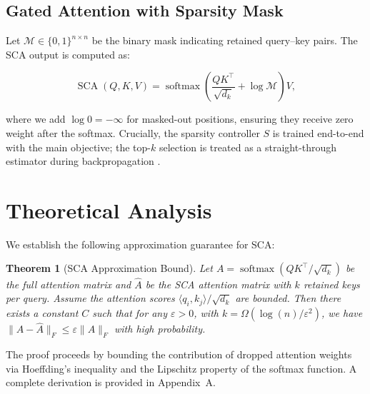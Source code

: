 \documentclass[12pt,a4paper,oneside]{book}
\newtheorem{theorem}{Theorem}[chapter]
\begin{document}
\subsection{Gated Attention with Sparsity Mask}

Let $\mathcal{M} \in \{0,1\}^{n \times n}$ be the binary mask indicating retained
query--key pairs. The SCA output is computed as:

\begin{equation}
  \operatorname{SCA}(Q,K,V) = \operatorname{softmax}\!\left(
    \frac{QK^{\top}}{\sqrt{d_k}} + \log \mathcal{M}
  \right) V ,
  \label{eq:sca}
\end{equation}

where we add $\log 0 = -\infty$ for masked-out positions, ensuring they receive zero
weight after the softmax. Crucially, the sparsity controller $S$ is trained end-to-end
with the main objective; the top-$k$ selection is treated as a straight-through estimator
during backpropagation \cite{bengio2013estimating}.

\section{Theoretical Analysis}

We establish the following approximation guarantee for SCA:

\begin{theorem}[SCA Approximation Bound]\label{thm:sca-bound}
  Let $A = \operatorname{softmax}(QK^{\top}/\sqrt{d_k})$ be the full attention matrix
  and $\hat{A}$ be the SCA attention matrix with $k$ retained keys per query. Assume
  the attention scores $\langle q_i, k_j \rangle / \sqrt{d_k}$ are bounded. Then there
  exists a constant $C$ such that for any $\varepsilon > 0$, with
  $k = \Omega(\log(n)/\varepsilon^2)$, we have
  $\|A - \hat{A}\|_F \leq \varepsilon \|A\|_F$ with high probability.
\end{theorem}

The proof proceeds by bounding the contribution of dropped attention weights via
Hoeffding's inequality and the Lipschitz property of the softmax function. A complete
derivation is provided in Appendix~A.
\end{document}
